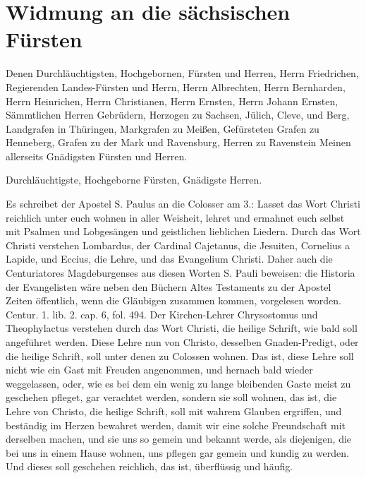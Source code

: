 
\chapter{Widmung an die sächsischen Fürsten}

Denen Durchläuchtigsten, Hochgebornen, Fürsten und Herren, Herrn Friedrichen, Regierenden Landes-Fürsten und Herrn, Herrn Albrechten, Herrn Bernharden, Herrn Heinrichen, Herrn Christianen, Herrn Ernsten, Herrn Johann Ernsten, Sämmtlichen Herren Gebrüdern, Herzogen zu Sachsen, Jülich, Cleve, und Berg, Landgrafen in Thüringen, Markgrafen zu Meißen, Gefürsteten Grafen zu Henneberg, Grafen zu der Mark und Ravensburg, Herren zu Ravenstein Meinen allerseits Gnädigsten Fürsten und Herren.

Durchläuchtigste, Hochgeborne Fürsten, Gnädigste Herren.

Es schreibet der Apostel S. Paulus an die Colosser am 3.: Lasset das Wort Christi reichlich unter euch wohnen in aller Weisheit, lehret und ermahnet euch selbst mit Psalmen und Lobgesängen und geistlichen lieblichen Liedern. Durch das Wort Christi verstehen Lombardus, der Cardinal Cajetanus, die Jesuiten, Cornelius a Lapide, und Eccius, die Lehre, und das Evangelium Christi. Daher auch die Centuriatores Magdeburgenses aus diesen Worten S. Pauli beweisen: die Historia der Evangelisten wäre neben den Büchern Altes Testaments zu der Apostel Zeiten öffentlich, wenn die Gläubigen zusammen kommen, vorgelesen worden. Centur. 1. lib. 2. cap. 6, fol. 494. Der Kirchen-Lehrer Chrysostomus und Theophylactus verstehen durch das Wort Christi, die heilige Schrift, wie bald soll angeführet werden. Diese Lehre nun von Christo, desselben Gnaden-Predigt, oder die heilige Schrift, soll unter denen zu Colossen wohnen. Das ist, diese Lehre soll nicht wie ein Gast mit Freuden angenommen, und hernach bald wieder weggelassen, oder, wie es bei dem ein wenig zu lange bleibenden Gaste meist zu geschehen pfleget, gar verachtet werden, sondern sie soll wohnen, das ist, die Lehre von Christo, die heilige Schrift, soll mit wahrem Glauben ergriffen, und beständig im Herzen bewahret werden, damit wir eine solche Freundschaft mit derselben machen, und sie uns so gemein und bekannt werde, als diejenigen, die bei uns in einem Hause wohnen, uns pflegen gar gemein und kundig zu werden. Und dieses soll geschehen reichlich, das ist, überflüssig und häufig.

